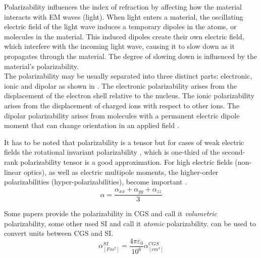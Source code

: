     Polarizability influences the index of refraction by affecting how the
    material interacts with \gls{EM}
    waves (light). When light enters a material, the oscillating electric field
    of the light wave induces a temporary dipoles in the atoms, or molecules in
    the material. This induced dipoles create their own electric field, which
    interfere with the incoming light wave, causing it to slow down as it
    propagates through the material. The degree of slowing down is influenced
    by the material's polarizability.   \\

    The polarizability may be usually separated into three distinct parts:
    electronic, ionic and dipolar as shown in
    . The electronic
    polarizability arises from the displacement of the electron shell relative
    to the nucleus. The ionic polarizability arises from the displacement of
    charged ions with respect to other ions. The dipolar polarizability arises
    from molecules with a permanent electric dipole moment that can change
    orientation in an applied field \cite{Kittel2004}. 

    It has to be noted that polarizability is a tensor but for cases of weak
    electric fields the rotational invariant polarizability
    , which is one-third of the
    second-rank polarizability tensor is a good approximation. For
    high electric fields (non-linear optics), as well as electric multipole
    moments, the higher-order polarizabilities
    (hyper-polarizabilities), become important \cite{Hohm1986}.
    \begin{equation}\label{eq:rotationalInvariantPolarizability}
        \alpha = \frac{\alpha_{xx} + \alpha_{yy} + \alpha_{zz}}{3}
    \end{equation}

    Some papers provide the polarizability in \gls{CGS} and call it
    \textit{volumetric} polarizability, some other used \gls{SI} and call it
    \textit{atomic} polarizability.  can be used
    to convert units between \gls{CGS} and \gls{SI}.
    \begin{equation}\label{eq:cgsToSiPolarizability}
        \alpha^{SI}_{[Fm^2]} =
        \frac{4\pi\varepsilon_0}{10^6}\alpha^{CGS}_{[cm^3]}
    \end{equation}

